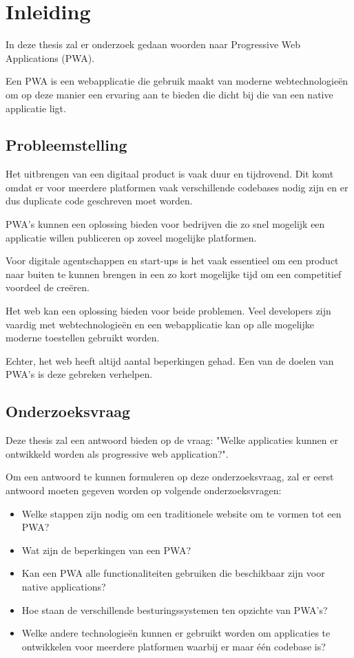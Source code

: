 

\chapter{Inleiding}
\label{ch:inleiding}

In deze thesis zal er onderzoek gedaan woorden naar Progressive Web Applications (PWA).

Een PWA is een webapplicatie die gebruik maakt van moderne webtechnologieën om op deze manier een ervaring aan te bieden die dicht bij die van een native applicatie ligt.

\section{Probleemstelling}

	Het uitbrengen van een digitaal product is vaak duur en tijdrovend. Dit komt omdat er voor meerdere platformen vaak verschillende codebases nodig zijn en er dus duplicate code geschreven moet worden. 
	
	PWA's kunnen een oplossing bieden voor bedrijven die zo snel mogelijk een applicatie willen publiceren op zoveel mogelijke platformen.
	
	Voor digitale agentschappen en start-ups is het vaak essentieel om een product naar buiten te kunnen brengen in een zo kort mogelijke tijd om een competitief voordeel de creëren. 
	
	Het web kan een oplossing bieden voor beide problemen. Veel developers zijn vaardig met webtechnologieën en een webapplicatie kan op alle mogelijke moderne toestellen gebruikt worden. 
	
	Echter, het web heeft altijd aantal beperkingen gehad. Een van de doelen van PWA's is deze gebreken verhelpen.


\section{Onderzoeksvraag}


	Deze thesis zal een antwoord bieden op de vraag: "Welke applicaties kunnen er ontwikkeld worden als progressive web application?".
	
	Om een antwoord te kunnen formuleren op deze onderzoeksvraag, zal er eerst antwoord moeten gegeven worden op volgende onderzoeksvragen:
	
	\begin{itemize}
		  \item Welke stappen zijn nodig om een traditionele website om te vormen tot een PWA?
		  \item Wat zijn de beperkingen van een PWA?
		  \item Kan een PWA alle functionaliteiten gebruiken die beschikbaar zijn voor native applications?
		  \item Hoe staan de verschillende besturingssystemen ten opzichte van PWA's?
		  \item Welke andere technologieën kunnen er gebruikt worden om applicaties te ontwikkelen voor meerdere platformen waarbij er maar één codebase is?
	  \end{itemize}

